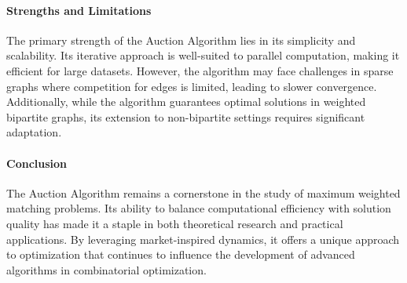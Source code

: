 \paragraph{Strengths and Limitations}
The primary strength of the Auction Algorithm lies in its simplicity and scalability. Its iterative approach is well-suited to parallel computation, making it efficient for large datasets. However, the algorithm may face challenges in sparse graphs where competition for edges is limited, leading to slower convergence. Additionally, while the algorithm guarantees optimal solutions in weighted bipartite graphs, its extension to non-bipartite settings requires significant adaptation.

\paragraph{Conclusion}
The Auction Algorithm remains a cornerstone in the study of maximum weighted matching problems. Its ability to balance computational efficiency with solution quality has made it a staple in both theoretical research and practical applications. By leveraging market-inspired dynamics, it offers a unique approach to optimization that continues to influence the development of advanced algorithms in combinatorial optimization.

